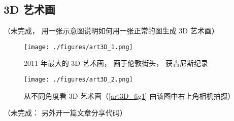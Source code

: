 
\subsection{3D 艺术画}
（未完成， 用一张示意图说明如何用一张正常的图生成 3D 艺术画）
\begin{figure}[ht]
\centering
\texttt{[image: ./figures/art3D\_1.png]}
\caption{2011 年最大的 3D 艺术画， 画于伦敦街头， 获吉尼斯纪录} \label{art3D_fig1}
\end{figure}

\begin{figure}[ht]
\centering
\texttt{[image: ./figures/art3D\_2.png]}
\caption{从不同角度看 3D 艺术画（\autoref{art3D_fig1} 由该图中右上角相机拍摄）} \label{art3D_fig2}
\end{figure}

（未完成： 另外开一篇文章分享代码）
